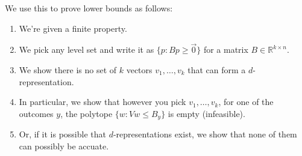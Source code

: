 \documentclass[12pt]{article}
\theoremstyle{definition}
\newcommand{\reals}{\mathbb{R}}
\begin{document}
We use this to prove lower bounds as follows:
\begin{enumerate}
  \item We're given a finite property.
  \item We pick any level set and write it as $\{ p : Bp \geq \vec{0}\}$ for a matrix $B \in \reals^{k \times n}$.
  \item We show there is no set of $k$ vectors $v_1,\dots,v_k$ that can form a $d$-representation.
  \item In particular, we show that however you pick $v_1,\dots,v_k$, for one of the outcomes $y$, the polytope $\{w : Vw \leq B_y \}$ is empty (infeasible).
  \item Or, if it is possible that $d$-representations exist, we show that none of them can possibly be accuate.
\end{enumerate}
\end{document}
